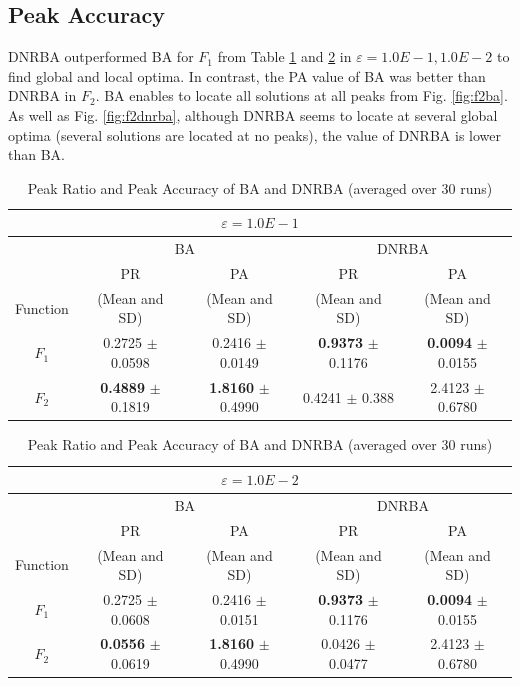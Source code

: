 \subsection{Peak Accuracy}
DNRBA outperformed BA for $F_1$ from Table \ref{tab1} and \ref{tab2} in $\varepsilon=1.0E-1, 1.0E-2$ to find global and local optima. In contrast, the PA value of BA was better than DNRBA in $F_2$. BA enables to locate all solutions at all peaks from Fig. \ref{fig:f2ba}. As well as Fig. \ref{fig:f2dnrba}, although DNRBA seems to locate at several global optima (several solutions are located at no peaks), the value of DNRBA is lower than BA.
\begin{table}[h]
\caption{Peak Ratio and Peak Accuracy of BA and DNRBA (averaged over 30 runs)}
\begin{center}
\begin{tabular}{c|c|c|c|c}
\multicolumn{5}{c}{$\varepsilon = 1.0E-1$} \\
\hline
\multicolumn{1}{c|}{} & \multicolumn{2}{c|}{BA} & \multicolumn{2}{c}{DNRBA} \\
\hline
 & PR & PA & PR & PA \\

Function & (Mean and SD) & (Mean and SD) & (Mean and SD) & (Mean and SD) \\
\hline
$F_1 $ & 0.2725 $\pm$ 0.0598 & 0.2416 $\pm$ 0.0149 & {\bf 0.9373} $\pm$ 0.1176  & {\bf 0.0094} $\pm$ 0.0155  \\
\hline
$F_2 $ & {\bf 0.4889} $\pm$ 0.1819 & {\bf 1.8160} $\pm$ 0.4990 & 0.4241 $\pm$ 0.388 & 2.4123 $\pm$ 0.6780 \\
\hline

\end{tabular}
\label{tab1}
\end{center}
\end{table}

\begin{table}[h]
\caption{Peak Ratio and Peak Accuracy of BA and DNRBA (averaged over 30 runs)}
\begin{center}
\begin{tabular}{c|c|c|c|c}
\multicolumn{5}{c}{$\varepsilon = 1.0E-2$} \\
\hline
\multicolumn{1}{c|}{} & \multicolumn{2}{c|}{BA} & \multicolumn{2}{c}{DNRBA} \\
\hline
 & PR & PA & PR & PA \\

Function & (Mean and SD) & (Mean and SD) & (Mean and SD) & (Mean and SD) \\
\hline
$F_1 $ & 0.2725 $\pm$ 0.0608 & 0.2416 $\pm$ 0.0151 & {\bf 0.9373} $\pm$ 0.1176  & {\bf 0.0094} $\pm$ 0.0155  \\
\hline
$F_2 $ & {\bf 0.0556} $\pm$ 0.0619 & {\bf 1.8160} $\pm$ 0.4990 & 0.0426 $\pm$ 0.0477 & 2.4123 $\pm$ 0.6780 \\
\hline

\end{tabular}
\label{tab2}
\end{center}
\end{table}

